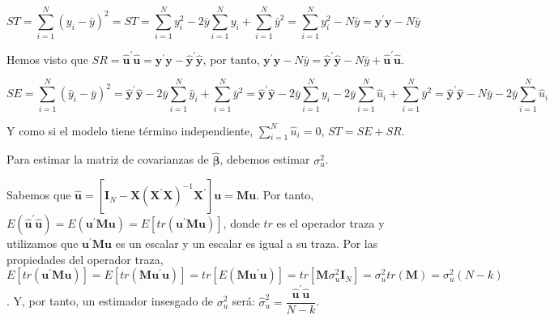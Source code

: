 \begin{equation*}
ST=\sum_{i=1}^{N}\left(y_{i}-\bar{y}\right)^{2}=ST=\sum_{i=1}^{N}y_{i}^{2}-2\bar{y}\sum_{i=1}^{N}y_{i}+\sum_{i=1}^{N}\bar{y}^{2}=\sum_{i=1}^{N}y_{i}^{2}-N\bar{y}=\boldsymbol{y}^{\prime}\boldsymbol{y}-N\bar{y}
\end{equation*}


Hemos visto que $SR=\hat{\boldsymbol{u}}^{\prime}\hat{\boldsymbol{u}}=\boldsymbol{y}^{\prime}\boldsymbol{y}-\hat{\boldsymbol{y}}^{\prime}\hat{\boldsymbol{y}}$,
por tanto, $\boldsymbol{y}^{\prime}\boldsymbol{y}-N\bar{y}=\hat{\boldsymbol{y}}^{\prime}\hat{\boldsymbol{y}}-N\bar{y}+\hat{\boldsymbol{u}}^{\prime}\hat{\boldsymbol{u}}$.

\begin{equation*}
SE=\sum_{i=1}^{N}\left(\hat{y}_{i}-\bar{y}\right)^{2}=\hat{\boldsymbol{y}}^{\prime}\hat{\boldsymbol{y}}-2\bar{y}\sum_{i=1}^{N}\hat{y}_{i}+\sum_{i=1}^{N}\bar{y}^{2}=\hat{\boldsymbol{y}}^{\prime}\hat{\boldsymbol{y}}-2\bar{y}\sum_{i=1}^{N}y_{i}-2\bar{y}\sum_{i=1}^{N}\hat{u}_{i}+\sum_{i=1}^{N}\bar{y}^{2}=\hat{\boldsymbol{y}}^{\prime}\hat{\boldsymbol{y}}-N\bar{y}-2\bar{y}\sum_{i=1}^{N}\hat{u}_{i}
\end{equation*}


Y como si el modelo tiene t\'ermino independiente, $\sum_{i=1}^{N}\hat{u}_{i}=0$,
$ST=SE+SR$.



Para estimar la matriz de covarianzas de $\hat{\boldsymbol{\beta}}$,
debemos estimar $\sigma_{u}^{2}$.

Sabemos que $\hat{\boldsymbol{u}}=\left[\boldsymbol{I}_{N}-\boldsymbol{X}\left(\boldsymbol{X}^{\prime}\boldsymbol{X}\right)^{-1}\boldsymbol{X}^{\prime}\right]\boldsymbol{u}=\boldsymbol{M}\boldsymbol{u}$.
Por tanto, $E\left(\hat{\boldsymbol{u}}^{\prime}\hat{\boldsymbol{u}}\right)=E\left(\boldsymbol{u}^{\prime}\boldsymbol{M}\boldsymbol{u}\right)=E\left[tr\left(\boldsymbol{u}^{\prime}\boldsymbol{M}\boldsymbol{u}\right)\right]$,
donde $tr$ es el operador traza y utilizamos que $\boldsymbol{u}^{\prime}\boldsymbol{M}\boldsymbol{u}$
es un escalar y un escalar es igual a su traza. Por las propiedades
del operador traza, $E\left[tr\left(\boldsymbol{u}^{\prime}\boldsymbol{M}\boldsymbol{u}\right)\right]=E\left[tr\left(\boldsymbol{M}\boldsymbol{u}^{\prime}\boldsymbol{u}\right)\right]=tr\left[E\left(\boldsymbol{M}\boldsymbol{u}^{\prime}\boldsymbol{u}\right)\right]=tr\left[\boldsymbol{M}\sigma_{u}^{2}\boldsymbol{I}_{N}\right]=\sigma_{u}^{2}tr\left(\boldsymbol{M}\right)=\sigma_{u}^{2}(N-k)$.
Y, por tanto, un estimador insesgado de $\sigma_{u}^{2}$ ser\'a: $\hat{\sigma}_{u}^{2}=\dfrac{\hat{\boldsymbol{u}}^{\prime}\hat{\boldsymbol{u}}}{N-k}$.


